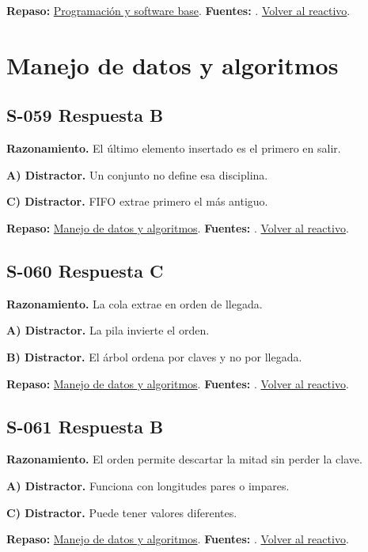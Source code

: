 \textbf{Repaso:} \hyperref[sec:s2]{Programación y software base}. \textbf{Fuentes:} \cite{ostep,cppreference,compiler}. \hyperref[q:S-058]{Volver al reactivo}.\par\medskip

\section{Manejo de datos y algoritmos}

\subsection*{S-059 \quad Respuesta B}\label{s:S-059}
\textbf{Razonamiento.} El último elemento insertado es el primero en salir.

\textbf{A) Distractor. }Un conjunto no define esa disciplina.

\textbf{C) Distractor. }FIFO extrae primero el más antiguo.

\textbf{Repaso:} \hyperref[sec:s3]{Manejo de datos y algoritmos}. \textbf{Fuentes:} \cite{algorithms,postgres,ai}. \hyperref[q:S-059]{Volver al reactivo}.\par\medskip

\subsection*{S-060 \quad Respuesta C}\label{s:S-060}
\textbf{Razonamiento.} La cola extrae en orden de llegada.

\textbf{A) Distractor. }La pila invierte el orden.

\textbf{B) Distractor. }El árbol ordena por claves y no por llegada.

\textbf{Repaso:} \hyperref[sec:s3]{Manejo de datos y algoritmos}. \textbf{Fuentes:} \cite{algorithms,postgres,ai}. \hyperref[q:S-060]{Volver al reactivo}.\par\medskip

\subsection*{S-061 \quad Respuesta B}\label{s:S-061}
\textbf{Razonamiento.} El orden permite descartar la mitad sin perder la clave.

\textbf{A) Distractor. }Funciona con longitudes pares o impares.

\textbf{C) Distractor. }Puede tener valores diferentes.

\textbf{Repaso:} \hyperref[sec:s3]{Manejo de datos y algoritmos}. \textbf{Fuentes:} \cite{algorithms,postgres,ai}. \hyperref[q:S-061]{Volver al reactivo}.\par\medskip

